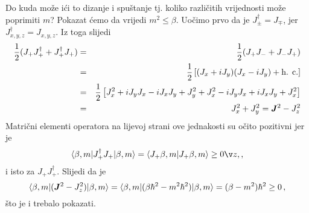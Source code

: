 Do kuda  može ići to dizanje i spuštanje tj. koliko različitih vrijednosti
može poprimiti $m$?
Pokazat ćemo da vrijedi $m^2 \leq \beta$.
Uočimo prvo da je $J_{\pm}^{\dagger}=J_{\mp}$, jer $J^{\dagger}_{x,y,z}=J_{x,y,z}$.
Iz toga slijedi
\begin{eqnarray*}
 \frac{1}{2}(J_+ J_{+}^{\dagger} + J_{+}^{\dagger}J_+)& = &
 \frac{1}{2}(J_+ J_{-}+ J_- J_+) \\
& = & \frac{1}{2} \left[ (J_x + i J_y)(J_x - i J_y) + \textrm{h. c.} \right]
\\ & = & \frac{1}{2} \left[ J_{x}^2 + i J_y J_x - i J_x J_y + J_{y}^2
  + J_{x}^2 - i J_y J_x + i J_x J_y + J_{x}^2 \right] \\
& = & J_{x}^2 + J_{y}^2 = \jsq - J_{z}^2
\end{eqnarray*}
Matrični elementi operatora na lijevoj strani ove jednakosti su očito
pozitivni jer je
\begin{displaymath}
\bra{\beta, m}J_{+}^{\dagger}J_+ \ket{\beta, m} =
\bra{J_{+}\beta, m}J_{+}\beta, m\rangle  \geq 0 ž,,
\end{displaymath}
i isto za $J_+ J_{+}^{\dagger}$.
Slijedi da je
\begin{displaymath}
\bra{\beta, m}(\jsq - J_{z}^2)\ket{\beta, m}=
\bra{\beta, m}(\beta\hbar^2 - m^2\hbar^2)\ket{\beta, m} =
(\beta - m^2)\hbar^2 \geq 0 \,,
\end{displaymath}
što je i trebalo pokazati.

